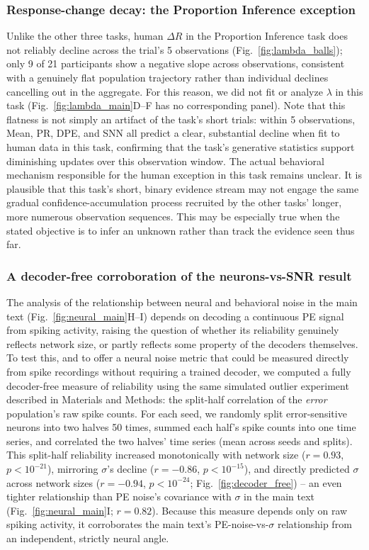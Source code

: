 \documentclass[12pt]{article}
\begin{document}
\subsubsection*{Response-change decay: the Proportion Inference exception}
Unlike the other three tasks, human $\Delta R$ in the Proportion Inference task does not reliably decline across the trial's 5 observations (Fig.~\ref{fig:lambda_balls}); only 9 of 21 participants show a negative slope across observations, consistent with a genuinely flat population trajectory rather than individual declines cancelling out in the aggregate. For this reason, we did not fit or analyze $\lambda$ in this task (Fig.~\ref{fig:lambda_main}D--F has no corresponding panel). Note that this flatness is not simply an artifact of the task's short trials: within 5 observations, Mean, PR, DPE, and SNN all predict a clear, substantial decline when fit to human data in this task, confirming that the task's generative statistics support diminishing updates over this observation window. The actual behavioral mechanism responsible for the human exception in this task remains unclear. It is plausible that this task's  short, binary evidence stream may not engage the same gradual confidence-accumulation process recruited by the other tasks' longer, more numerous observation sequences. This may be especially true when the stated objective is to infer an unknown rather than track the evidence seen thus far.

\subsubsection*{A decoder-free corroboration of the neurons-vs-SNR result}
The analysis of the relationship between neural and behavioral noise in the main text (Fig.~\ref{fig:neural_main}H--I) depends on decoding a continuous PE signal from spiking activity, raising the question of whether its reliability genuinely reflects network size, or partly reflects some property of the decoders themselves. To test this, and to offer a neural noise metric that could be measured directly from spike recordings without requiring a trained decoder, we computed a fully decoder-free measure of reliability using the same simulated outlier experiment described in Materials and Methods: the split-half correlation of the \textit{error} population's raw spike counts. For each seed, we randomly split error-sensitive neurons into two halves 50 times, summed each half's spike counts into one time series, and correlated the two halves' time series (mean across seeds and splits). This split-half reliability increased monotonically with network size ($r=0.93$, $p<10^{-21}$), mirroring $\sigma$'s decline ($r=-0.86$, $p<10^{-15}$), and directly predicted $\sigma$ across network sizes ($r=-0.94$, $p<10^{-24}$; Fig.~\ref{fig:decoder_free}) -- an even tighter relationship than PE noise's covariance with $\sigma$ in the main text (Fig.~\ref{fig:neural_main}I; $r=0.82$). Because this measure depends only on raw spiking activity, it corroborates the main text's PE-noise-vs-$\sigma$ relationship from an independent, strictly neural angle.
\end{document}
